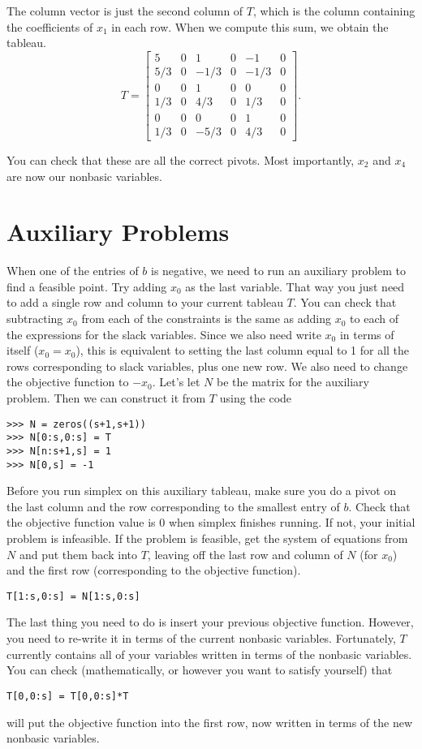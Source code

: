 The column vector is just the second column of $T$, which is the column containing the coefficients of $x_1$ in each row.
When we compute this sum, we obtain the tableau.
\[
	T = \begin{bmatrix}
		5 &  0 & 1 & 0 & -1 & 0 \\
		5/3 & 0 &-1/3 & 0 &-1/3 & 0 \\
		0 & 0 & 1 & 0 & 0 & 0 \\
		1/3 & 0 & 4/3 & 0 & 1/3 & 0 \\
		0 & 0 & 0 & 0 & 1 & 0 \\
		1/3 & 0 & -5/3 & 0 & 4/3 & 0
	\end{bmatrix}.
\]

You can check that these are all the correct pivots.
Most importantly, $x_2$ and $x_4$ are now our nonbasic variables.

\section*{Auxiliary Problems}

When one of the entries of $b$ is negative, we need to run an auxiliary problem to find a feasible point.
Try adding $x_0$ as the last variable.
That way you just need to add a single row and column to your current tableau $T$.
You can check that subtracting $x_0$ from each of the constraints is the same as adding $x_0$ to each of the expressions for the slack variables.
Since we also need write $x_0$ in terms of itself ($x_0 = x_0$), this is equivalent to setting the last column equal to 1 for all the rows corresponding to slack variables, plus one new row.
We also need to change the objective function to $-x_0$.
Let's let $N$ be the matrix for the auxiliary problem.
Then we can construct it from $T$ using the code 
\begin{lstlisting}
>>> N = zeros((s+1,s+1))
>>> N[0:s,0:s] = T
>>> N[n:s+1,s] = 1
>>> N[0,s] = -1
\end{lstlisting}

Before you run simplex on this auxiliary tableau, make sure you do a pivot on the last column and the row corresponding to the smallest entry of $b$.
Check that the objective function value is 0 when simplex finishes running.
If not, your initial problem is infeasible.
If the problem is feasible, get the system of equations from $N$ and put them back into $T$, leaving off the last row and column of $N$ (for $x_0$) and the first row (corresponding to the objective function).
\begin{lstlisting}
T[1:s,0:s] = N[1:s,0:s]
\end{lstlisting}
The last thing you need to do is insert your previous objective function.
However, you need to re-write it in terms of the current nonbasic variables.
Fortunately, $T$ currently contains all of your variables written in terms of the nonbasic variables.
You can check (mathematically, or however you want to satisfy yourself) that
\begin{lstlisting}
T[0,0:s] = T[0,0:s]*T
\end{lstlisting}
will put the objective function into the first row, now written in terms of the new nonbasic variables.

